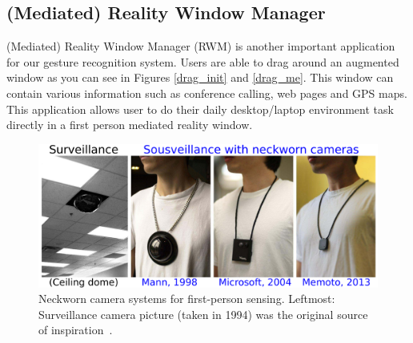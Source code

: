 \subsection{(Mediated) Reality Window Manager}
(Mediated) Reality Window Manager (RWM) is another important application for our gesture recognition system. Users are able to drag around an augmented window as you can see in Figures \ref{drag_init} and \ref{drag_me}. This window can contain various information such as conference calling, web pages and GPS maps. This application allows user to do their daily desktop/laptop environment task directly in a first person mediated reality window.

\begin{figure}
\centering
\includegraphics[width=6in]{ch5/figs/coop_surveillance_sousveillance_fixed_with_vi.pdf}
\caption{Neckworn camera systems for first-person sensing.
         Leftmost: Surveillance camera picture (taken in 1994) was the original
         source of inspiration~\cite{lo2013augmediated}.} 
\label{neckcams} 
\end{figure}

